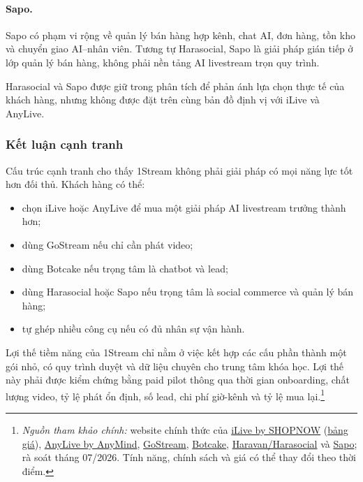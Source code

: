 \paragraph{Sapo.}
Sapo có phạm vi rộng về quản lý bán hàng hợp kênh, chat AI, đơn hàng, tồn kho và
chuyển giao AI--nhân viên. Tương tự Harasocial, Sapo là giải pháp gián tiếp ở lớp
quản lý bán hàng, không phải nền tảng AI livestream trọn quy trình.

Harasocial và Sapo được giữ trong phân tích để phản ánh lựa chọn thực tế của khách
hàng, nhưng không được đặt trên cùng bản đồ định vị với iLive và AnyLive.

\subsubsection{Kết luận cạnh tranh}

Cấu trúc cạnh tranh cho thấy 1Stream không phải giải pháp có mọi năng lực tốt hơn
đối thủ. Khách hàng có thể:
\begin{itemize}
    \item chọn iLive hoặc AnyLive để mua một giải pháp AI livestream trưởng thành hơn;
    \item dùng GoStream nếu chỉ cần phát video;
    \item dùng Botcake nếu trọng tâm là chatbot và lead;
    \item dùng Harasocial hoặc Sapo nếu trọng tâm là social commerce và quản lý bán hàng;
    \item tự ghép nhiều công cụ nếu có đủ nhân sự vận hành.
\end{itemize}

Lợi thế tiềm năng của 1Stream chỉ nằm ở việc kết hợp các cấu phần thành một gói
nhỏ, có quy trình duyệt và dữ liệu chuyên cho trung tâm khóa học. Lợi thế này phải
được kiểm chứng bằng paid pilot thông qua thời gian onboarding, chất lượng video,
tỷ lệ phát ổn định, số lead, chi phí giờ-kênh và tỷ lệ mua lại.\footnote{\scriptsize
\textit{Nguồn tham khảo chính:}
website chính thức của
\href{https://www.ilive.vn/}{iLive by SHOPNOW}
(\href{https://www.ilive.vn/pricing}{bảng giá}),
\href{https://anymindgroup.com/products/anylive/}{AnyLive by AnyMind},
\href{https://gostream.co/}{GoStream},
\href{https://botcake.io/}{Botcake},
\href{https://www.haravan.com/}{Haravan/Harasocial}
và
\href{https://www.sapo.vn/}{Sapo};
rà soát tháng 07/2026.
Tính năng, chính sách và giá có thể thay đổi theo thời điểm.}
